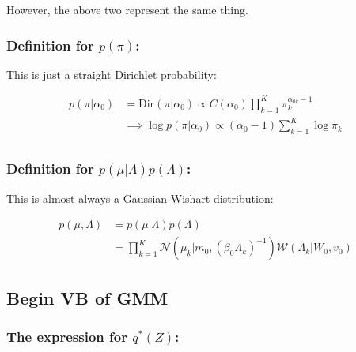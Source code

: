 \documentclass{article}
\begin{document}
However, the above two represent the same thing.

\subsubsection{Definition for $p(\pi)$:}

This is just a straight Dirichlet probability:

\begin{equation}
\begin{split}
p(\pi | \alpha_0) &= \mathrm{Dir}(\pi| \alpha_0) \propto C(\alpha_0) \prod_{k=1}^K \pi_k^{\alpha_{0k} - 1}  \\
&\implies \log p(\pi | \alpha_0) \propto (\alpha_0 -1)  \sum_{k=1}^K \log \pi_k\\
\end{split}
\end{equation}

\subsubsection{Definition for $p(\mu| \Lambda )p( \Lambda )$:}

This is almost always a Gaussian-Wishart distribution:

\begin{equation}
\begin{split}
p (\mu, \Lambda) &= p (\mu | \Lambda) p (\Lambda)\\
&= \prod_{k=1}^K \mathcal{N} (\mu_k | m_0, (\beta_0 \Lambda_k)^{-1} ) \mathcal{W} ( \Lambda_k | W_0, v_0)
\end{split}
\end{equation}



\subsection{Begin VB of GMM}

\subsubsection{The expression for $q^*(Z)$:}
\end{document}
